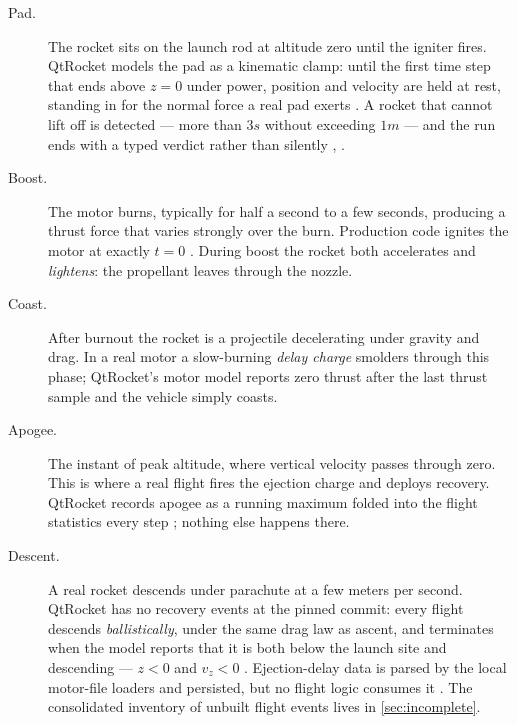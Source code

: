 \begin{description}
\item[Pad.] The rocket sits on the launch rod at altitude zero until the igniter fires.
  QtRocket models the pad as a kinematic clamp: until the first time step that ends above
  $z = 0$ under power, position and velocity are held at rest, standing in for the normal
  force a real pad exerts . A rocket that cannot lift off is
  detected --- more than $3\unit{s}$ without exceeding $1\unit{m}$ --- and the run ends with a
  typed  verdict rather than silently ,
  .
\item[Boost.] The motor burns, typically for half a second to a few seconds, producing a
  thrust force that varies strongly over the burn. Production code ignites the motor at
  exactly $t = 0$ . During boost the rocket both
  accelerates and \emph{lightens}: the propellant leaves through the nozzle.
\item[Coast.] After burnout the rocket is a projectile decelerating under gravity and drag.
  In a real motor a slow-burning \emph{delay charge} smolders through this phase; QtRocket's
  motor model reports zero thrust after the last thrust sample 
  and the vehicle simply coasts.
\item[Apogee.] The instant of peak altitude, where vertical velocity passes through zero.
  This is where a real flight fires the ejection charge and deploys recovery. QtRocket
  records apogee as a running maximum folded into the flight statistics every step
  ; nothing else happens there.
\item[Descent.] A real rocket descends under parachute at a few meters per second. QtRocket
  has no recovery events at the pinned commit: every flight descends \emph{ballistically},
  under the same drag law as ascent, and terminates when the model reports that it is both
  below the launch site and descending --- $z < 0$ and $v_z < 0$
  . Ejection-delay data is parsed by the local motor-file
  loaders and persisted, but no flight logic consumes it . The consolidated
  inventory of unbuilt flight events lives in \cref{sec:incomplete}.
\end{description}


